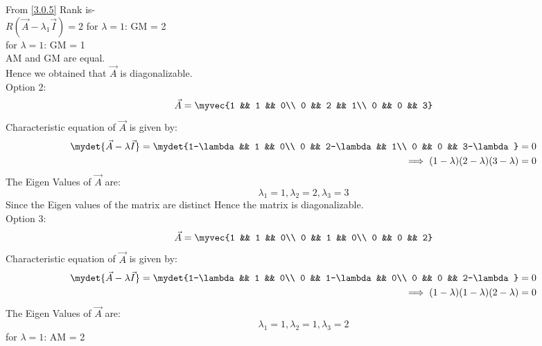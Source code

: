 \documentclass[journal,12pt,twocolumn]{IEEEtran}
\begin{document}
From \eqref{3.0.5} Rank is-\\
$R(\vec{A} - \lambda_1 \vec{I}) = 2$
for $\lambda = 1$: GM = 2\\
for $\lambda = 1$: GM = 1\\
AM and GM are equal.\\
Hence we obtained that $\vec{A}$ is diagonalizable.\\
Option 2:
\begin{equation*}
\vec{A} = \myvec{1 && 1 && 0\\ 0 && 2 && 1\\ 0 && 0 && 3}
\end{equation*}
Characteristic equation of $\vec{A}$ is given by:
\begin{equation} \label{3.0.6}
\begin{split}
\mydet{\vec{A}-\lambda \vec{I}}=\mydet{1-\lambda && 1 && 0\\ 0 && 2-\lambda && 1\\ 0 && 0 && 3-\lambda} = 0\\
\implies (1-\lambda)(2-\lambda)(3-\lambda) = 0
\end{split}
\end{equation}
The Eigen Values of $\vec{A}$ are:
\begin{equation} \label{3.0.7}
\lambda_1 = 1, \lambda_2 = 2, \lambda_3 = 3
\end{equation}
Since the Eigen values of the matrix are distinct Hence the matrix is diagonalizable.\\
Option 3:
\begin{equation*}
\vec{A} = \myvec{1 && 1 && 0\\ 0 && 1 && 0\\ 0 && 0 && 2}
\end{equation*}
Characteristic equation of $\vec{A}$ is given by:
\begin{equation} \label{3.0.8}
\begin{split}
\mydet{\vec{A}-\lambda \vec{I}}=\mydet{1-\lambda && 1 && 0\\ 0 && 1-\lambda && 0\\ 0 && 0 && 2-\lambda} = 0\\
\implies (1-\lambda)(1-\lambda)(2-\lambda) = 0
\end{split}
\end{equation}
The Eigen Values of $\vec{A}$ are:
\begin{equation} \label{3.0.9}
\lambda_1 = 1, \lambda_2 = 1, \lambda_3 = 2
\end{equation}
for $\lambda = 1$: AM = 2\\
\end{document}
